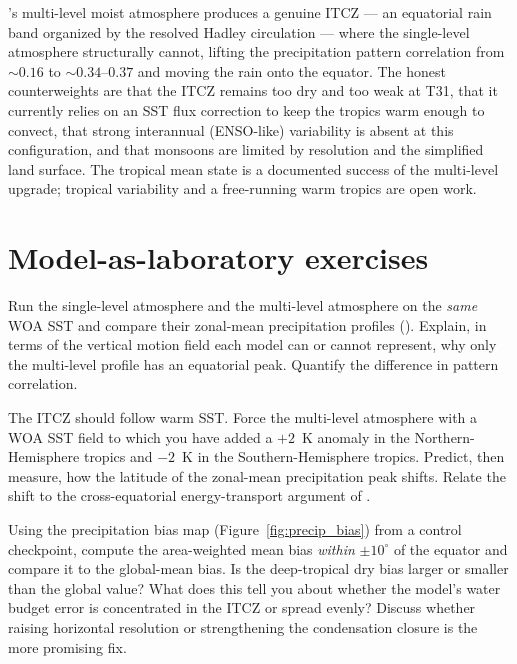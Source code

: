 \model{}'s multi-level moist atmosphere produces a genuine ITCZ --- an equatorial rain band
organized by the resolved Hadley circulation --- where the single-level atmosphere structurally
cannot, lifting the precipitation pattern correlation from $\sim0.16$ to $\sim0.34$--$0.37$ and
moving the rain onto the equator. The honest counterweights are that the ITCZ remains too dry and
too weak at T31, that it currently relies on an SST flux correction to keep the tropics warm
enough to convect, that strong interannual (ENSO-like) variability is absent at this
configuration, and that monsoons are limited by resolution and the simplified land surface. The
tropical mean state is a documented success of the multi-level upgrade; tropical variability and
a free-running warm tropics are open work.

\section*{Model-as-laboratory exercises}

\begin{exercise}
Run the single-level atmosphere and the multi-level \dino{} atmosphere on the \emph{same} WOA
SST and compare their zonal-mean precipitation profiles (). Explain,
in terms of the vertical motion field each model can or cannot represent, why only the multi-level
profile has an equatorial peak. Quantify the difference in pattern correlation.
\end{exercise}

\begin{exercise}
The ITCZ should follow warm SST. Force the multi-level atmosphere with a WOA SST field to which
you have added a $+2$~K anomaly in the Northern-Hemisphere tropics and $-2$~K in the
Southern-Hemisphere tropics. Predict, then measure, how the latitude of the zonal-mean
precipitation peak shifts. Relate the shift to the cross-equatorial energy-transport argument of
\citet{vallis2017}.
\end{exercise}

\begin{exercise}
Using the precipitation bias map (Figure~\ref{fig:precip_bias}) from a control checkpoint,
compute the area-weighted mean bias \emph{within} $\pm10^\circ$ of the equator and compare it to
the global-mean bias. Is the deep-tropical dry bias larger or smaller than the global value? What
does this tell you about whether the model's water budget error is concentrated in the ITCZ or
spread evenly? Discuss whether raising horizontal resolution or strengthening the condensation
closure is the more promising fix.
\end{exercise}
